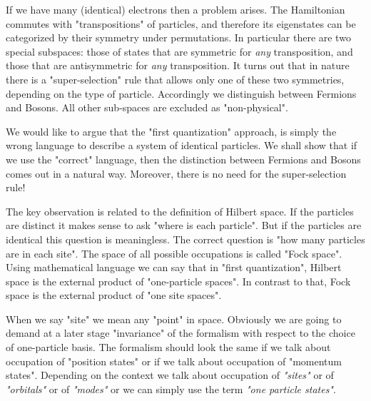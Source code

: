 \documentclass[onecolumn,fleqn, 11pt]{revtex4}
\begin{document}
If we have many (identical) electrons then a problem 
arises. The Hamiltonian commutes with "transpositions" 
of particles, and therefore its eigenstates can be categorized 
by their symmetry under permutations. In particular there 
are two special subspaces: those of states that are symmetric 
for {\em any} transposition, and those that are antisymmetric 
for {\em any} transposition. It turns out that in nature 
there is a "super-selection" rule that allows only one 
of these two symmetries, depending on the type of particle. 
Accordingly we distinguish between Fermions and Bosons.
All other sub-spaces are excluded as "non-physical".     


We would like to argue that the "first quantization" approach, 
is simply the wrong language to describe a system of identical particles. 
We shall show that if we use the "correct" language, 
then the distinction between Fermions and Bosons comes out 
in a natural way. Moreover, there is no need for the super-selection rule!


The key observation is related to the definition of Hilbert space. 
If the particles are distinct it makes sense to ask 
"where is each particle". But if the particles are identical 
this question is meaningless. The correct question is 
"how many particles are in each site". The space of all possible 
occupations is called "Fock space". Using mathematical language 
we can say that in "first quantization", Hilbert space is the 
external product of "one-particle spaces". In contrast to that, 
Fock space is the external product of "one site spaces".


When we say "site" we mean any "point" in space. Obviously we 
are going to demand at a later stage "invariance" 
of the formalism with respect to the choice of one-particle basis. 
The formalism should look the same if we talk about occupation of 
"position states" or if we talk about occupation 
of "momentum states". Depending on the context we 
talk about occupation of {\em "sites"} or of {\em "orbitals"} 
or of {\em "modes"} or we can simply use the term {\em "one particle states"}.    
\end{document}
